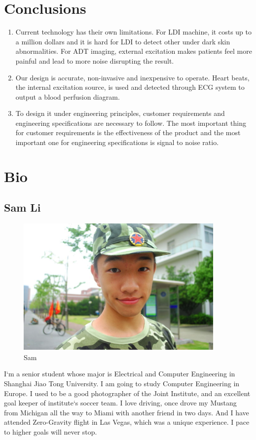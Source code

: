 \documentclass[paper=letter, fontsize=11pt]{scrartcl}
\numberwithin{equation}{section}		%
\numberwithin{figure}{section}			%
\numberwithin{table}{section}			%
\begin{document}
\section{Conclusions}
\begin{enumerate}
\item Current technology has their own limitations. For LDI machine, it costs up to a million dollars and it is 
hard for LDI to detect other under dark skin abnormalities. For ADT imaging, external excitation makes patients
feel more painful and lead to more noise disrupting the result. \\
\item Our design is accurate, non-invasive and inexpensive to operate. Heart beats, the internal excitation source,
is used and detected through ECG system to output a blood perfusion diagram. \\
\item To design it under engineering principles, customer requirements and engineering specifications are necessary
to follow. The most important thing for customer requirements is the effectiveness of the product and the most 
important one for engineering specifications is signal to noise ratio.
\end{enumerate}

\pagebreak
\section{Bio}
\subsection{Sam Li}
\begin{figure}[H]
	\centering
	\includegraphics[scale=1]{lmt}
	\caption{Sam}
\end{figure}
I`m a senior student whose major is Electrical and Computer Engineering in Shanghai Jiao Tong University. I am going to study Computer Engineering in Europe. I used to be a good photographer of the Joint Institute, and an excellent goal keeper of institute`s soccer team. I love driving, once drove my Mustang from Michigan all the way to Miami with another friend in two days. And I have attended Zero-Gravity flight in Las Vegas, which was a unique experience. I pace to higher goals will never stop.
\pagebreak
\end{document}
